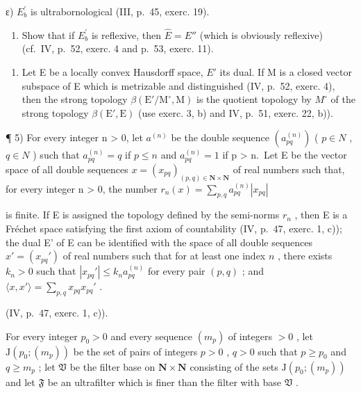 ε) \(E_{b}^{\prime}\) is ultrabornological (III, p.~45, exerc. 19).

\begin{enumerate}
\def\labelenumi{\alph{enumi})}
\setcounter{enumi}{2}
\tightlist
\item
  Show that if \(E_{b}^{\prime}\) is reflexive, then \(\hat{E} = E''\) (which is obviously reflexive) (cf.~IV, p.~52, exerc. 4 and p.~53, exerc. 11).
\end{enumerate}

\begin{enumerate}
\def\labelenumi{\arabic{enumi})}
\setcounter{enumi}{3}
\tightlist
\item
  Let E be a locally convex Hausdorff space, \(E'\) its dual. If M is a closed vector subspace of E which is metrizable and distinguished (IV, p.~52, exerc. 4), then the strong topology \(\beta(\mathrm{E}'/\mathrm{M}^{\circ}, \mathrm{M})\) is the quotient topology by \(M^{\circ}\) of the strong topology \(\beta(\mathrm{E}', \mathrm{E})\) (use exerc. 3, b) and IV, p.~51, exerc. 22, b)).
\end{enumerate}

¶ 5) For every integer n \textgreater{} 0, let \(a^{(n)}\) be the double sequence \((a_{pq}^{(n)})\) ( \(p \in N\) , \(q \in N\) ) such that \(a_{pq}^{(n)} = q\) if \(p \leqslant n\) and \(a_{pq}^{(n)} = 1\) if p \textgreater{} n.~Let E be the vector space of all double sequences \(x = (x_{pq})_{(p,q) \in \mathbf{N} \times \mathbf{N}}\) of real numbers such that, for every integer n \textgreater{} 0, the number \(r_n(x) = \sum_{p,q} a_{pq}^{(n)} |x_{pq}|\)

is finite. If E is assigned the topology defined by the semi-norms \(r_n\) , then E is a Fréchet space satisfying the first axiom of countability (IV, p.~47, exerc. 1, c)); the dual E' of E can be identified with the space of all double sequences \(x' = (x_{pq}')\) of real numbers such that for at least one index \(n\) , there exists \(k_n > 0\) such that \(|x_{pq}'| \leqslant k_n a_{pq}^{(n)}\) for every pair \((p, q)\) ; and \(\langle x, x' \rangle = \sum_{p, q} x_{pq} x_{pq}'\) .

(IV, p.~47, exerc. 1, c)).

For every integer \(p_0 > 0\) and every sequence \((m_p)\) of integers \(> 0\) , let \(\mathrm{J}(p_0; (m_p))\) be the set of pairs of integers \(p > 0\) , \(q > 0\) such that \(p \geqslant p_0\) and \(q \geqslant m_p\) ; let \(\mathfrak{V}\) be the filter base on \(\mathbf{N} \times \mathbf{N}\) consisting of the sets \(\mathrm{J}(p_0; (m_p))\) and let \(\mathfrak{F}\) be an ultrafilter which is finer than the filter with base \(\mathfrak{V}\) .

